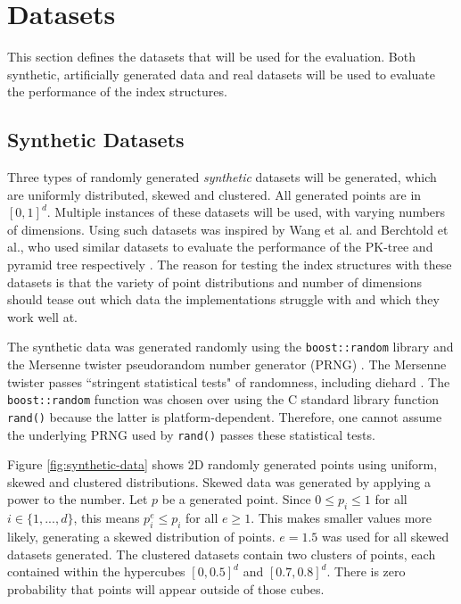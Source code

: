 \section{Datasets}
\label{sec:datasets}

This section defines the datasets that will be used for the evaluation. Both synthetic, artificially generated data and real datasets will be used to evaluate the performance of the index structures.

\subsection{Synthetic Datasets}

Three types of randomly generated \textit{synthetic} datasets will be generated, which are uniformly distributed, skewed and clustered. All generated points are in $[0,1]^d$. Multiple instances of these datasets will be used, with varying numbers of dimensions. Using such datasets was inspired by Wang et al. and Berchtold et al., who used similar datasets to evaluate the performance of the PK-tree and pyramid tree respectively \cite{pk-tree, pyramid-tree}. The reason for testing the index structures with these datasets is that the variety of point distributions and number of dimensions should tease out which data the implementations struggle with and which they work well at.

The synthetic data was generated randomly using the \texttt{boost::random} library and the Mersenne twister pseudorandom number generator (PRNG) \cite{mersenne-twister}.  The Mersenne twister passes ``stringent statistical tests" of randomness, including diehard \cite{mersenne-twister}. The \texttt{boost::random} function was chosen over using the C standard library function \texttt{rand()} because the latter is platform-dependent. Therefore, one cannot assume the underlying PRNG used by \texttt{rand()} passes these statistical tests.

Figure \ref{fig:synthetic-data} shows 2D randomly generated points using uniform, skewed and clustered distributions. Skewed data was generated by applying a power to the number. Let $p$ be a generated point. Since $0 \leq p_i \leq 1$ for all $i \in \lbrace 1, ..., d \rbrace$, this means $p_i^e \leq p_i$ for all $e \geq 1$. This makes smaller values more likely, generating a skewed distribution of points. $e = 1.5$ was used for all skewed datasets generated. The clustered datasets contain two clusters of points, each contained within the hypercubes $[0,0.5]^d$ and $[0.7,0.8]^d$. There is zero probability that points will appear outside of those cubes.

